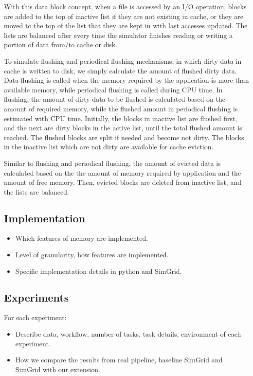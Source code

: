 \documentclass[conference]{IEEEtran}
\begin{document}
			With this data block concept, when a file is accessed by an I/O operation, blocks are added to the top of inactive list if they are not existing in cache, or they are moved to the top of the list that they are kept in with last accesses updated. The lists are balanced after every time the simulator finishes reading or writing a portion of data from/to cache or disk.
			
			To simulate flushing and periodical flushing mechanisms, in which dirty data in cache is written to disk, we simply calculate the amount of flushed dirty data. Data flushing is called when the memory required by the application is more than available memory, while periodical flushing is called during CPU time. In flushing, the amount of dirty data to be flushed is calculated based on the amount of required memory, while the flushed amount in periodical flushing is estimated with CPU time. Initially, the blocks in inactive list are flushed first, and the next are dirty blocks in the active list, until the total flushed amount is reached. The flushed blocks are split if needed and become not dirty. The blocks in the inactive list which are not dirty are available for cache eviction. 
			
			Similar to flushing and periodical flushing, the amount of evicted data is calculated based on the the amount of memory required by application and the amount of free memory. Then, evicted blocks are deleted from inactive list, and the lists are balanced.
			
		\subsection{Implementation}
			\begin{itemize}
				\item Which features of memory are implemented.
				\item Level of granularity, how features are implemented.
				\item Specific implementation details in python and SimGrid.
			\end{itemize}

		\subsection{Experiments}
			For each experiment: 
			\begin{itemize}
				\item Describe data, workflow, number of tasks, task details, environment of each experiment.
				\item How we compare the results from real pipeline, baseline SimGrid  and SimGrid with our extension.
			\end{itemize}
	
\end{document}
